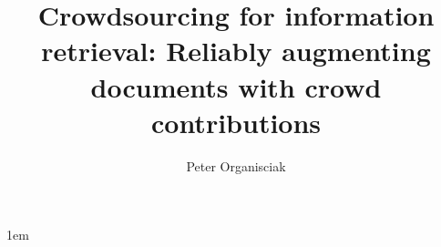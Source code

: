 \documentclass[draftthesis,tocnosub,noragright,centerchapter,12pt]{uiucecethesis09}
\title{Crowdsourcing for information retrieval: Reliably augmenting documents with crowd contributions}
\author{Peter Organisciak}
\begin{document}
%

%
\maketitle

\parindent 1em%

\frontmatter

%


%

%
%

%
\tableofcontents

%

%

%
\end{document}
